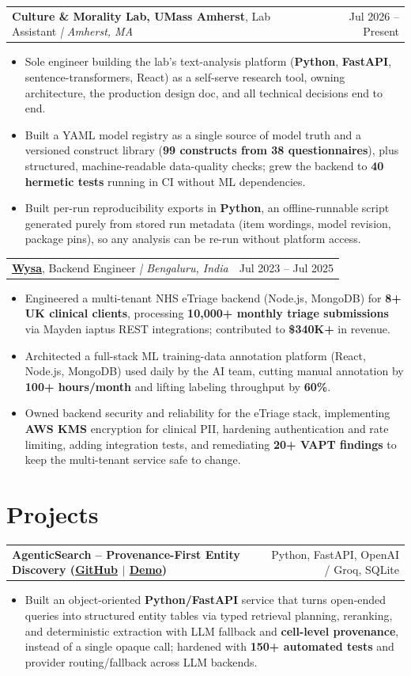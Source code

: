 \documentclass[letterpaper,11pt]{article}
\makeatletter
\newcommand{\expItem}[4]{%
  \vspace{2pt}
  \begin{tabular*}{\textwidth}{@{}l@{\extracolsep{\fill}}r@{}}
    \textbf{#1}, #2 \textit{| #3} & #4 \\
  \end{tabular*}\par\vspace{-3pt}
}
\newcommand{\projItem}[2]{%
  \vspace{2pt}
  \begin{tabular*}{\textwidth}{@{}l@{\extracolsep{\fill}}r@{}}
    \textbf{#1} & #2 \\
  \end{tabular*}\par\vspace{-3pt}
}
\makeatother
\begin{document}
\expItem{Culture \& Morality Lab, UMass Amherst}{Lab Assistant}{Amherst, MA}{Jul 2026 -- Present}
\begin{itemize}
  \item Sole engineer building the lab's text-analysis platform (\textbf{Python}, \textbf{FastAPI}, sentence-transformers, React) as a self-serve research tool, owning architecture, the production design doc, and all technical decisions end to end.
  \item Built a YAML model registry as a single source of model truth and a versioned construct library (\textbf{99 constructs from 38 questionnaires}), plus structured, machine-readable data-quality checks; grew the backend to \textbf{40 hermetic tests} running in CI without ML dependencies.
  \item Built per-run reproducibility exports in \textbf{Python}, an offline-runnable script generated purely from stored run metadata (item wordings, model revision, package pins), so any analysis can be re-run without platform access.
\end{itemize}

\expItem{\href{https://www.wysa.io}{Wysa}}{Backend Engineer}{Bengaluru, India}{Jul 2023 -- Jul 2025}
\begin{itemize}
  \item Engineered a multi-tenant NHS eTriage backend (Node.js, MongoDB) for \textbf{8+ UK clinical clients}, processing \textbf{10{,}000+ monthly triage submissions} via Mayden iaptus REST integrations; contributed to \textbf{\$340K+} in revenue.
  \item Architected a full-stack ML training-data annotation platform (React, Node.js, MongoDB) used daily by the AI team, cutting manual annotation by \textbf{100+ hours/month} and lifting labeling throughput by \textbf{60\%}.
  \item Owned backend security and reliability for the eTriage stack, implementing \textbf{AWS KMS} encryption for clinical PII, hardening authentication and rate limiting, adding integration tests, and remediating \textbf{20+ VAPT findings} to keep the multi-tenant service safe to change.
\end{itemize}

\section{Projects}

\projItem{AgenticSearch -- Provenance-First Entity Discovery {\normalfont\small(\href{https://github.com/Deva-1903/ciir_agentic_search}{GitHub} $\vert$ \href{https://agentic-search-negglszkwa-uc.a.run.app}{Demo})}}{Python, FastAPI, OpenAI / Groq, SQLite}
\begin{itemize}
  \item Built an object-oriented \textbf{Python/FastAPI} service that turns open-ended queries into structured entity tables via typed retrieval planning, reranking, and deterministic extraction with LLM fallback and \textbf{cell-level provenance}, instead of a single opaque call; hardened with \textbf{150+ automated tests} and provider routing/fallback across LLM backends.
\end{itemize}
\end{document}
